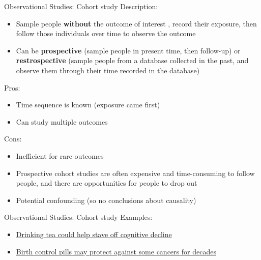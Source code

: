 \documentclass[
  ignorenonframetext,
]{beamer}
\providecommand{\tightlist}{%
  \setlength{\itemsep}{0pt}\setlength{\parskip}{0pt}}
\begin{document}
\begin{frame}{Observational Studies: Cohort study}
\protect\hypertarget{observational-studies-cohort-study-2}{}
Description:

\begin{itemize}
\tightlist
\item
  Sample people \textbf{without} the outcome of interest , record their
  exposure, then follow those individuals over time to observe the
  outcome
\item
  Can be \textbf{prospective} (sample people in present time, then
  follow-up) or \textbf{restrospective} (sample people from a database
  collected in the past, and observe them through their time recorded in
  the database)
\end{itemize}

Pros:

\begin{itemize}
\tightlist
\item
  Time sequence is known (exposure came first)
\item
  Can study multiple outcomes
\end{itemize}

Cons:

\begin{itemize}
\tightlist
\item
  Inefficient for rare outcomes
\item
  Prospective cohort studies are often expensive and time-consuming to
  follow people, and there are opportunities for people to drop out
\item
  Potential confounding (so no conclusions about causality)
\end{itemize}
\end{frame}

\begin{frame}{Observational Studies: Cohort study}
\protect\hypertarget{observational-studies-cohort-study-3}{}
Examples:

\begin{itemize}
\tightlist
\item
  \href{https://www.medicalnewstoday.com/articles/316619.php}{Drinking
  tea could help stave off cognitive decline}
\item
  \href{https://www.medicalnewstoday.com/articles/316565.php}{Birth
  control pills may protect against some cancers for decades}
\end{itemize}
\end{frame}
\end{document}
